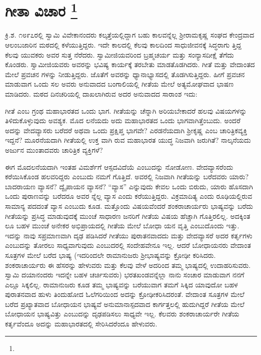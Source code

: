
\chapter[ಗೀತಾ ವಿಚಾರ ]{ಗೀತಾ ವಿಚಾರ \protect\footnote{}}

ಕ್ರಿ.ಶ. ೧೮೯೭ರಲ್ಲಿ ಸ್ವಾಮಿ ವಿವೇಕಾನಂದರು ಕಲ್ಕತ್ತೆಯಲ್ಲಿದ್ದಾಗ ಬಹು ಕಾಲವನ್ನೆಲ್ಲ ಶ‍್ರೀರಾಮಕೃಷ್ಣ ಸಂಘದ ಕೇಂದ್ರವಾದ ಆಲಂಬಜಾರಿನ ಮಠದಲ್ಲಿ ಕಳೆಯುತ್ತಿದ್ದರು. ಇದೇ ಕಾಲದಲ್ಲಿ ಕೆಲವು ಕಾಲದಿಂದ ಸಾಧುಜೀವನಕ್ಕೆ ಸಿದ್ಧರಾಗು ತ್ತಿದ್ದ ಕೆಲವು ಯುವಕರು ಅವರ ಸುತ್ತ ನೆರೆದರು. ಸ್ವಾಮೀಜಿಯವರಿಂದ ಬ್ರಹ್ಮಚರ್ಯ ಮತ್ತು ಸಂನ್ಯಾಸದೀಕ್ಷೆ ತೆಗೆದು ಕೊಂಡರು. ಸ್ವಾಮೀಜಿಯವರು ಅವರನ್ನು ಭವಿಷ್ಯ ಕಾರ್ಯಕ್ಕೆ ತರಬೇತು ಮಾಡತೊಡಗಿದರು. ಗೀತೆ ಮತ್ತು ವೇದಾಂತದ ಮೇಲೆ ಪ್ರವಚನ ಗಳನ್ನು ನೀಡುತ್ತಿದ್ದರು. ಜೊತೆಗೆ ಅವರನ್ನು ಧ್ಯಾನಾಭ್ಯಾಸದಲ್ಲಿ ತೊಡಗಿಸುತ್ತಿದ್ದರು. ಹೀಗೆ ಪ್ರವಚನ ಮಾಡುವಾಗ ಒಂದು ಸಲ ಅವರು ಅನುವಾದದ ಬಂಗಾಲಿಯಲ್ಲಿ ಗೀತೆಯ ಮೇಲೆ ಅತ್ಯಮೋಘವಾದ ಭಾಷಣ ಮಾಡಿದರು. ಮಠದ ದಿನಚರಿಯಲ್ಲಿ ದಾಖಲಾಗಿರುವ ಅದರ ಅನುವಾದದ ಸಾರಾಂಶ ಇದು:

ಗೀತೆ ಎಂಬ ಗ್ರಂಥ ಮಹಾಭಾರತದ ಒಂದು ಭಾಗ. ಗೀತೆಯನ್ನು ಚೆನ್ನಾಗಿ ಅರಿಯಬೇಕಾದರೆ ಹಲವು ವಿಷಯಗಳನ್ನು ತಿಳಿದುಕೊಳ್ಳುವುದು ಅವಶ್ಯಕ. ಮೊದ ಲನೆಯದು ಅದು ಮಹಾಭಾರತದ ಒಂದು ಭಾಗವಾಗಿತ್ತೆಂಬುದು. ಅಂದರೆ ಅದನ್ನು ವೇದವ್ಯಾಸರು ಬರೆದರೆ ಅಥವಾ ಒಂದು ಪ್ರಕ್ಷಿಪ್ತ ಭಾಗವೇ? ಎರಡನೆಯದಾಗಿ ಶ‍್ರೀಕೃಷ್ಣ ಎಂಬ ಚಾರಿತ್ರಿಕವ್ಯಕ್ತಿ ಇದ್ದನೆ? ಮೂರನೆಯದಾಗಿ ಗೀತೆಯಲ್ಲಿ ಉಕ್ತ ವಾಗಿ ರುವ ಮಹಾಭಾರತ ಯುದ್ಧ ನಿಜವಾಗಿ ಜರುಗಿತೆ? ನಾಲ್ಕನೆಯದು ಅರ್ಜುನ ಮುಂತಾದವರು ಚಾರಿತ್ರಿಕ ವ್ಯಕ್ತಿಗಳೆ?

ಈಗ ಮೊದಲನೆಯದಾಗಿ ಇಂತಹ ವಿಮರ್ಶೆಗೆ ಆಸ್ಪದವಿದೆಯೆ ಎಂಬುದನ್ನು ನೋಡೋಣ. ವೇದವ್ಯಾಸರೆಂದು ಕರೆಯಿಸಿಕೊಂಡ ಹಲವರಿದ್ದರು ಎಂಬುದು ನಮಗೆ ಗೊತ್ತಿದೆ. ಅವರಲ್ಲಿ ನಿಜವಾಗಿ ಗೀತೆಯನ್ನು ಬರೆದವರು ಯಾರು? ಬಾದರಾಯಣ ವ್ಯಾಸನೆ? ದ್ವೈಪಾಯನ ವ್ಯಾಸನೆ? “ವ್ಯಾಸ” ಎನ್ನುವುದು ಕೇವಲ ಒಂದು ಬಿರುದು, ಯಾರು ಹೊಸದಾಗಿ ಒಂದು ಪುರಾಣವನ್ನು ಬರೆದರೂ ಅವರ ನ್ನೆಲ್ಲ ವ್ಯಾಸ ಎಂದು ಕರೆಯುತ್ತಿದ್ದರು. ವಿಕ್ರಮಾದಿತ್ಯ ಎಂದು ರೂಢಿಯಲ್ಲಿರುವ ಸಾಮಾನ್ಯ ಪದದಂತೆ ವ್ಯಾಸ ಎಂಬುದು ಕೂಡ. ಮತ್ತೊಂದು ವಿಷಯವೆಂದರೆ ಶಂಕರಾಚಾರ್ಯರು ಭಾಷ್ಯವನ್ನು ಬರೆದು ಗೀತೆಯನ್ನು ಪ್ರಸಿದ್ಧ ಮಾಡುವುದಕ್ಕೆ ಮುಂಚೆ ಸಾಧಾರಣ ಜನರಿಗೆ ಗೀತೆಯ ವಿಷಯ ಹೆಚ್ಚಾಗಿ ಗೊತ್ತಿರಲಿಲ್ಲ. ಅದಕ್ಕಿಂತ ಲೂ ಬಹಳ ಮುಂಚೆ ಅನೇಕರ ಅಭಿಪ್ರಾಯದಲ್ಲಿ ಗೀತೆಯ ಮೇಲೆ ಬೋಧಾ ಯನ ವೃತ್ತಿ ಎಂಬುದೊಂದು ಇತ್ತು. ಇದನ್ನು ನಾವು ಸಪ್ರಮಾಣವಾಗಿ ದೃಢ ಪಡಿಸಿದರೆ ಗೀತೆಯು ಪುರಾತನವಾದದು ಮತ್ತು ವೇದವ್ಯಾಸರೆ ಅದರ ಕರ್ತೃಗಳು ಎಂಬುದನ್ನು ತೋರಲು ಸಾಧ್ಯವಾಗುವುದು ಎಂಬುದರಲ್ಲಿ ಸಂದೇಹವೇನೂ ಇಲ್ಲ. ಆದರೆ ಬೋಧಾಯನರು ವೇದಾಂತ ಸೂತ್ರಗಳ ಮೇಲೆ ಬರೆದ ಭಾಷ್ಯ (ಇದರಿಂದಲೇ ರಾಮಾನುಜರು ಶ‍್ರೀಭಾಷ್ಯವನ್ನು ಕ್ರೋಢೀ ಕರಿಸಿದರು. ಶಂಕರಾಚಾರ್ಯರು ಈ ಹೆಸರನ್ನು ಹೇಳುವರು ಮತ್ತು ಕೆಲವು ವೇಳೆ ಅದರಿಂದ ತಮ್ಮ ಭಾಷ್ಯದಲ್ಲಿ ಉದಾಹರಿಸುವರು. ಸ್ವಾಮಿ ದಯಾನಂದರು ಇದನ್ನೇ ಬಹಳ ಚರ್ಚಿಸುವರು) ಭರತಖಂಡವನ್ನೆಲ್ಲಾ ನಾನು ಸಂಚಾರ ಮಾಡುವಾಗ ನನಗೆ ಎಲ್ಲೂ ಸಿಕ್ಕಲಿಲ್ಲ. ರಾಮಾನುಜರು ಕೂಡ ತಮ್ಮ ಭಾಷ್ಯವನ್ನು ಬರೆಯುವಾಗ ತಮಗೆ ಸಿಕ್ಕಿದ ಯಾವುದೋ ಬಹಳ ಪುರಾತನವಾದ ಹುಳು ತಿಂದುಹೋದ ಓಲೆಗರಿಯಿಂದ ಅದನ್ನು ಕ್ರೋಢೀಕರಿಸಿದರಂತೆ. ವೇದಾಂತ ಸೂತ್ರಗಳ ಮೇಲೆ ಬರೆದ ಪ್ರಖ್ಯಾತವಾದ ಬೋಧಾಯನ ಭಾಷ್ಯವೆ ಅನುಮಾನಾಸ್ಪದವಾದ ಕಾರ್ಗತ್ತಲಲ್ಲಿ ಹುದುಗಿದ್ದರೆ ಗೀತೆಯ ಮೇಲೆ ಬೋಧಾಯನ ಭಾಷ್ಯವಿತ್ತು ಎಂಬುದನ್ನು ದೃಢಪಡಿಸಲು ಸಾಧ್ಯವೇ ಇಲ್ಲ. ಕೆಲವರು ಶಂಕರಾಚಾರ್ಯರೇ ಗೀತೆಯ ಕರ್ತೃವೆಂದೂ ಅದನ್ನು ಮಹಾಭಾರತದಲ್ಲಿ ಸೇರಿಸಿದರೆಂದೂ ಹೇಳುವರು.

